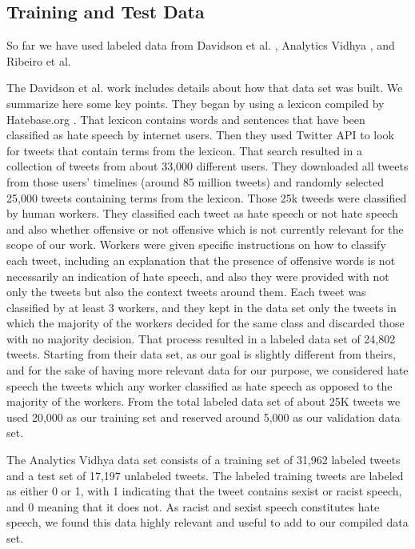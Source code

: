 \documentclass[conference]{sig-alternate-05-2015}
\begin{document}
\subsection{Training and Test Data}
So far we have used labeled data from Davidson et al. \cite{Davidsonetal.}, Analytics Vidhya \cite{vidhya}, and Ribeiro et al. \cite{ribeiro2017like}

The Davidson et al. work includes details about how that data set was built. We summarize here some key points. They began by using a lexicon compiled by Hatebase.org \cite{HateBaseOrg}. That lexicon contains words and sentences that have been classified as hate speech by internet users. Then they used Twitter API to look for tweets that contain terms from the lexicon. That search resulted in a collection of tweets from about 33,000 different users. They downloaded all tweets from those users' timelines (around 85 million tweets) and randomly selected 25,000 tweets containing terms from the lexicon. Those 25k tweeds were classified by human workers. They classified each tweet as hate speech or not hate speech and also whether offensive or not offensive which is not currently relevant for the scope of our work. Workers were given specific instructions on how to classify each tweet, including an explanation that the presence of offensive words is not necessarily an indication of hate speech, and also they were provided with not only the tweets but also the context tweets around them. Each tweet was classified by at least 3 workers, and they kept in the data set only the tweets in which the majority of the workers decided for the same class and discarded those with no majority decision.  That process resulted in a labeled data set of 24,802 tweets.
Starting from their data set, as our goal is slightly different from theirs, and for the sake of having more relevant data for our purpose,  we considered hate speech the tweets which any worker classified as hate speech as opposed to the majority of the workers. 
From the total labeled data set of about 25K tweets we used 20,000 as our training set and reserved around 5,000 as our validation data set.

The Analytics Vidhya data set consists of a training set of 31,962 labeled tweets and a test set of 17,197 unlabeled tweets. The labeled training tweets are labeled as either 0 or 1, with 1 indicating that the tweet contains sexist or racist speech, and 0 meaning that it does not. As racist and sexist speech constitutes hate speech, we found this data highly relevant and useful to add to our compiled data set.
\end{document}
